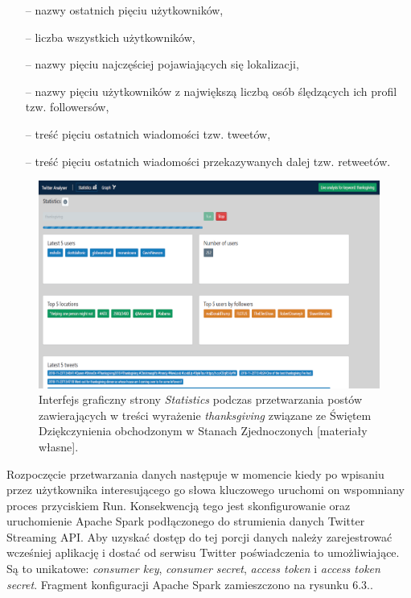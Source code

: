 \begin{itemize}
	\item[--] nazwy ostatnich pięciu użytkowników,
	\item[--] liczba wszystkich użytkowników,
	\item[--] nazwy pięciu najczęściej pojawiających się lokalizacji,
	\item[--] nazwy pięciu użytkowników z największą liczbą osób ślędzących ich profil tzw. followersów,
	\item[--] treść pięciu ostatnich wiadomości tzw. tweetów,
	\item[--] treść pięciu ostatnich wiadomości przekazywanych dalej tzw. retweetów.
\end{itemize}

\begin{figure}[h] %
	\centering
	\includegraphics[width=1.0\linewidth]{img/twitter_analyser_thanks_giving_2}
	\caption{Interfejs graficzny strony \textit{Statistics} podczas przetwarzania postów zawierających w treści wyrażenie \textit{thanksgiving} związane ze Świętem Dziękczynienia obchodzonym w Stanach Zjednoczonych [materiały własne].}
\end{figure}

Rozpoczęcie przetwarzania danych następuje w momencie kiedy po wpisaniu przez użytkownika interesującego go słowa kluczowego uruchomi on wspomniany proces przyciskiem Run. Konsekwencją tego jest skonfigurowanie oraz uruchomienie Apache Spark podłączonego do strumienia danych Twitter Streaming API. Aby uzyskać dostęp do tej porcji danych należy zarejestrować wcześniej aplikację i dostać od serwisu Twitter poświadczenia to umożliwiające. Są to unikatowe: \textit{consumer key}, \textit{consumer secret}, \textit{access token} i \textit{access token secret}. Fragment konfiguracji Apache Spark zamieszczono na rysunku 6.3..

